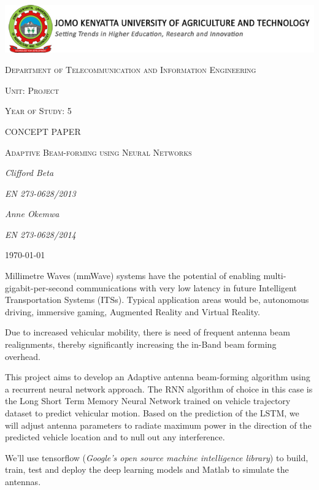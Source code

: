 \documentclass[12pt,a4paper]{article}
\begin{document}
\begin{titlepage}
	\centering
	\includegraphics[width=1.2\textwidth]{src/logo-jkuat.jpg}\par\vspace{1cm}
	\vspace{1cm}
	{\scshape\Large Department of Telecommunication and Information Engineering\par}
	\vspace{1cm}
	{\scshape\Large Unit: Project\par}
	\vspace{1cm}
	{\scshape\Large Year of Study: 5\par}
	\vspace{1cm}
	{\scshape\Large CONCEPT PAPER\par}
	\vspace{1cm}
	{\scshape\Large Adaptive Beam-forming using Neural Networks\par}
	\vspace{1cm}
	
	{\Large\itshape Clifford Beta \par}
	{\Large\itshape EN 273-0628/2013\par}
	{\Large\itshape Anne Okemwa \par}
	{\Large\itshape EN 273-0628/2014\par}
	\vfill




	{\large \today\par}

\end{titlepage}
\newpage
\par Millimetre Waves (mmWave) systems have the potential of enabling multi-gigabit-per-second communications with very low latency in future Intelligent Transportation Systems (ITSs). Typical application areas would be, autonomous driving, immersive gaming, Augmented Reality and Virtual Reality.

\par Due to increased vehicular mobility, there is need of frequent antenna beam realignments, thereby significantly increasing the in-Band beam forming overhead.

\par This project aims to develop an Adaptive antenna beam-forming algorithm using a recurrent neural network approach. The RNN algorithm of choice in this case is the Long Short Term Memory Neural Network trained on vehicle trajectory dataset to predict vehicular motion.
Based on the prediction of the LSTM, we will adjust antenna parameters to radiate maximum power in the direction of the predicted vehicle location and to null out any
interference.
\par We'll use tensorflow (\emph {Google's open source machine intelligence library}) to build, train, test and deploy the deep learning models and Matlab to simulate the antennas. 
\end{document}
